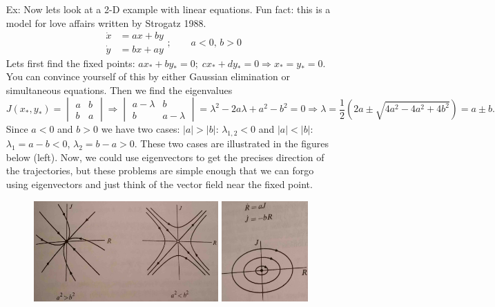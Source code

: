 \documentclass[reqno]{amsart}
\theoremstyle{definition}
\begin{document}
\begin{enumerate}
\item[Ex:  ]  Now lets look at a 2-D example with linear equations.  Fun fact: this is a model for
love affairs written by Strogatz 1988.
%
\begin{equation}
\begin{split}
\dot{x} &= ax + by\\
\dot{y} &= bx + ay
\end{split}; \qquad a < 0,\, b>0
\end{equation}
%
Lets first find the fixed points: $ax_* + by_* = 0;\; cx_* + dy_* = 0 \Rightarrow x_* = y_* = 0$.
You can convince yourself of this by either Gaussian elimination or simultaneous equations.
Then we find the eigenvalues
%
\begin{equation*}
J(x_*,y_*) = \begin{vmatrix}
a & b\\
b & a
\end{vmatrix} \Rightarrow \begin{vmatrix}
a - \lambda & b\\
b & a - \lambda
\end{vmatrix} = \lambda^2 - 2a\lambda + a^2 - b^2 = 0
\Rightarrow \lambda = \frac{1}{2}\left(2a \pm \sqrt{4a^2 - 4a^2 + 4b^2}\right) = a \pm b.
\end{equation*}
%
Since $a < 0$ and $b > 0$ we have two cases:
%
$|a| > |b|$:  $\lambda_{1,2} < 0$ and $|a| < |b|$:  $\lambda_1 = a - b < 0$, $\lambda_2 = b - a > 0$.
These two cases are illustrated in the figures below (left).  Now, we could use eigenvectors to get the precises
direction of the trajectories, but these problems are simple enough that we can forgo using eigenvectors
and just think of the vector field near the fixed point.
%
\begin{figure}[htbp]
\centering
\includegraphics[width = 0.668\textwidth]{Love1}
\includegraphics[width = 0.312\textwidth]{Love2}

\end{figure}
\end{enumerate}
\end{document}

